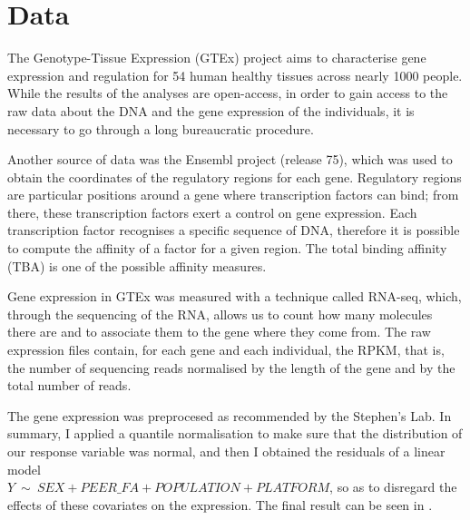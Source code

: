 \section{Data}

The Genotype-Tissue Expression (GTEx) project  
aims to characterise gene expression and regulation for 54 human healthy 
tissues across nearly 1000 people. While the results of the analyses are 
open-access, in order to gain access to the raw data about the DNA and 
the gene expression of the individuals, it is necessary to go through a 
long bureaucratic procedure.

Another source of data was the Ensembl project (release 75), 
 which was used to obtain the 
coordinates of the regulatory regions for each gene. Regulatory regions 
are particular positions around a gene where transcription factors can 
bind; from there, these transcription factors exert a control on gene 
expression. Each 
transcription factor recognises a specific sequence of DNA, therefore it 
is possible to compute the affinity of a factor for a given region. The 
total binding affinity (TBA) 
 is one of the 
possible affinity measures.

Gene expression in GTEx was measured with a technique called RNA-seq, 
which, through the sequencing of the RNA, allows us to count how many 
molecules there are and to associate them to the gene where they come 
from. The raw expression files contain, for each gene and each 
individual, the RPKM,  
that is, the number of sequencing reads normalised by the length of the 
gene and by the total number of reads.

The gene expression was preprocesed as recommended by the Stephen's 
Lab. 
In summary, I applied a quantile normalisation to make sure that the 
distribution of our response variable was normal, and then I obtained 
the residuals of a linear model \\
$Y~\sim~SEX+PEER\_FA+POPULATION+PLATFORM$, so as to disregard the 
effects of these covariates on the expression. The final result can be 
seen in .

